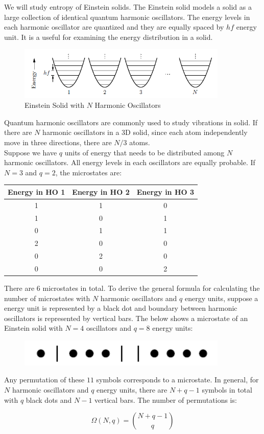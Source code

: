 We will study entropy of Einstein solids. The Einstein solid models a solid as a large collection of identical quantum harmonic oscillators. The energy levels in each harmonic oscillator are quantized and they are equally spaced by $hf$ energy unit. It is a useful for examining the energy distribution in a solid.

\begin{figure}[H]
	\centering
	\includegraphics[width=100mm]{39.png}
	\caption{Einstein Solid with $N$ Harmonic Oscillators}
\end{figure}

Quantum harmonic oscillators are commonly used to study vibrations in solid. If there are $N$ harmonic oscillators in a 3D solid, since each atom independently move in three directions, there are $N/3$ atoms. \\

Suppose we have $q$ units of energy that needs to be distributed among $N$ harmonic oscillators. All energy levels in each oscillators are equally probable. If $N=3$ and $q=2$, the microstates are:

\begin{center}
	\begin{tabular}{|c|c|c|}
		\hline
		Energy in HO 1 & Energy in HO 2 & Energy in HO 3 \\
		\hline
		1 & 1 & 0 \\
		\hline
		1 & 0 & 1 \\
		\hline
		0 & 1 & 1 \\
		\hline
		2 & 0 & 0 \\
		\hline
		0 & 2 & 0 \\
		\hline
		0 & 0 & 2 \\
		\hline
	\end{tabular}
\end{center}

There are $6$ microstates in total. To derive the general formula for calculating the number of microstates with $N$ harmonic oscillators and $q$ energy units, suppose a energy unit is represented by a black dot and boundary between harmonic oscillators is represented by vertical bars. The below shows a microstate of an Einstein solid with $N=4$ oscillators and $q=8$ energy units:

\begin{figure}[H]
	\centering
	\includegraphics[width=100mm]{40.png}
\end{figure}

Any permutation of these $11$ symbols corresponds to a microstate. In general, for $N$ harmonic oscillators and $q$ energy units, there are $N+q-1$ symbols in total with $q$ black dots and $N-1$ vertical bars. The number of permutations is:

\[\Omega(N,q)={N+q-1 \choose q}\]
